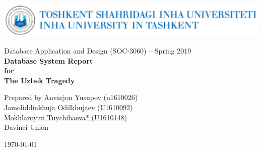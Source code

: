\documentclass[12pt,a4paper]{article}
\begin{document}
\begin{flushleft}
\includegraphics[scale=0.8]{inha_logo.eps}  
\end{flushleft}

\begin{flushright}


	\bigskip
	\large{Database Application and Design (SOC-3060) -- Spring 2019}\\
	\bigskip\bigskip
	\Huge\textbf{Database System Report} \\
	\bigskip\bigskip
	\Large \textbf{for} \\
	\bigskip\bigskip
	\Huge \textbf{The Uzbek Tragedy} 
	\bigskip\bigskip\bigskip
	
	\large Prepared by Anvarjon Yusupov (u1610026)\\
			Jamoliddinkhuja Odilkhujaev (U1610092)\\
			\underline{Mokhlaroyim Tuychibaeva* (U1610148)}\\ 
	\bigskip\bigskip\bigskip
	\large Davinci Union
	
	\bigskip\bigskip\bigskip
	\today
\end{flushright}

\newpage

\noindent 

\noindent 

\noindent 

\noindent 
\end{document}
